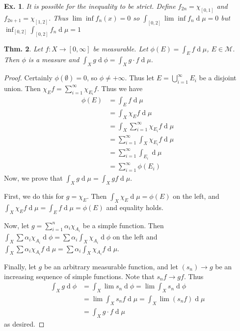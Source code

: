 \documentclass[12pt, a4paper]{book}
\renewcommand{\d}[1]{\ensuremath{\operatorname{d}\!{#1}}} %
\newtheorem{theorem}{Thm.}[section]
\newtheorem{example}[theorem]{Ex.}
\theoremstyle{nonumberplain}
\newtheorem{proof}{Proof}
\begin{document}
\begin{example}
    It is possible for the inequality to be strict.
    Define $f_{2n}=\chi_{[0,1]}$ and $f_{2n+1}=\chi_{[1,2]}$.
    Thus $\lim\inf f_n(x)=0$ so $\int_{[0,2]}\lim\inf f_n\d{\mu}=0$ but $\inf_[0,2]\int_{[0,2]}f_n\d{\mu}=1$
\end{example}
\begin{theorem}
    Let $f:X\to[0,\infty]$ be measurable.
    Let $\phi(E)=\int_E f\d{\mu}$, $E\in\mathcal{M}$.
    Then $\phi$ is a measure and $\int_X g\d{\phi}=\int_X g\cdot f\d{\mu}$.
\end{theorem}
\begin{proof}
    Certainly $\phi(\emptyset)=0$, so $\phi\neq+\infty$.
    Thus let $E=\bigcup\limits_{i=1}^\infty E_i$ be a disjoint union.
    Then $\chi_E f=\sum\limits_{i=1}^\infty\chi_{E_i}f$.
    Thus we have
    \begin{align*}
        \phi(E) &= \int_Ef\d{\mu}\\
                &= \int_X\chi_E f\d{\mu}\\
                &= \int_X\sum\limits_{i=1}^\infty \chi_{E_i}f\d{\mu}\\
                &= \sum\limits_{i=1}^\infty\int_X\chi_{E_i}f\d{\mu}\\
                &= \sum\limits_{i=1}^\infty \int_{E_i}\d{\mu}\\
                &= \sum\limits_{i=1}^\infty\phi(E_i)
    \end{align*}
    Now, we prove that $\int_X g\d{\mu}=\int_Xgf\d{\mu}$.

    First, we do this for $g=\chi_E$.
    Then $\int_X\chi_E\d{\mu}=\phi(E)$ on the left, and $\int_X\chi_E f\d{\mu}=\int_E f\d{\mu}=\phi(E)$ and equality holds.

    Now, let $g=\sum\limits_{i=1}^n\alpha_i\chi_{A_i}$ be a simple function.
    Then $\int_X\sum\alpha_i\chi_{A_i}\d{\phi}=\sum\alpha_i\int_X\chi_{A_i}\d{\phi}$ on the left and $\int_X\sum\alpha_i\chi_{A_i}f\d{\mu}=\sum\alpha_i\int_X\chi_{A_i}f\d{\mu}$.

    Finally, let $g$ be an arbitrary measurable function, and let $(s_n)\to g$ be an increasing sequence of simple functions.
    Note that $s_nf\to gf$.
    Thus
    \begin{align*}
        \int_Xg\d{\phi}&=\int_X\lim s_n\d{\phi}=\lim\int_Xs_n\d{\phi}\\
                       &=\lim\int_Xs_n f\d{\mu}=\int_X\lim(s_nf)\d{\mu}\\
                       &=\int_Xg\cdot f\d{\mu}
    \end{align*}
    as desired.
\end{proof}
\end{document}
